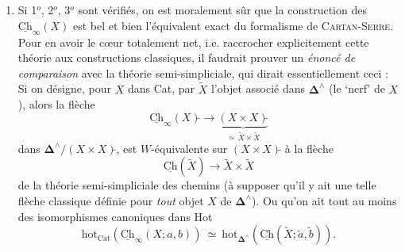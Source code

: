 \documentclass[11pt]{article}
\newcommand{\uCh}{\underline{\mathrm{Ch}}}
\newcommand{\hot}{\mathrm{hot}}
\begin{document}
\begin{enumerate}[label={}, leftmargin=*]
\item[5$^o$)] Si 1$^o$, 2$^o$, 3$^o$ sont vérifiés, on est moralement sûr que la construction des $\uCh_\infty(X)$ est bel et bien l'équivalent exact du formalisme de \textsc{Cartan-Serre}. Pour en avoir le c\oe ur totalement net, i.e. raccrocher explicitement cette théorie aux constructions classiques, il faudrait prouver un \textit{énoncé de comparaison} avec la théorie semi-simpliciale, qui dirait essentiellement ceci : Si on désigne, pour $X$ dans Cat, par $\tilde{X}$ l'objet associé dans $\mathbf{\Delta}^\wedge$ (le `nerf' de $X$), alors la flèche
\[
\uCh_\infty(X)\tilde{}\longrightarrow\underbrace{(X\times X)\tilde{}}_{\simeq\,\tilde{X}\times\tilde{X}}
\]
dans $\mathbf{\Delta}^\wedge/(X\times X)\tilde{}$, est $W$-équivalente sur $(X\times X)\tilde{}$ à la flèche
\[
\uCh(\tilde{X})\longrightarrow\tilde{X}\times\tilde{X}
\]
de la théorie semi-simpliciale des chemins (à supposer qu'il y ait une telle flèche classique définie pour \textit{tout} objet $X$ de $\mathbf{\Delta}^\wedge$). Ou qu'on ait tout au moins des isomorphismes canoniques dans Hot
\[
\hot_{\mathrm{Cat}}(\uCh_\infty(X;a,b))\ \simeq\ \hot_{\mathbf{\Delta}^\wedge}(\uCh(\tilde{X};\tilde{a},\tilde{b})).
\]
\end{enumerate}
\end{document}
